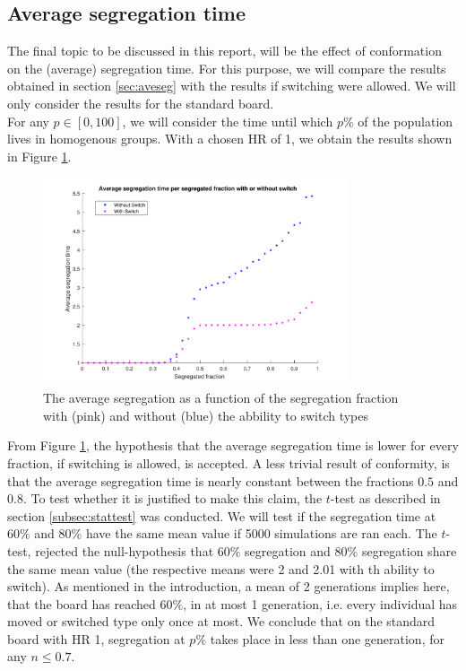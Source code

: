 \subsection{Average segregation time}
The final topic to be discussed in this report, will be the effect of conformation on the (average) segregation time. 
For this purpose, we will compare the results obtained in section \ref{sec:aveseg} with the results if switching were allowed. 
We will only consider the results for the standard board.\\
For any \(p\in [0,100]\), we will consider the time until which \(p\%\) of the population lives in homogenous groups. With a chosen HR of 1, we obtain the results shown in Figure \ref{fig:avesegsw}.

\begin{figure}[H]
    \centering
    \includegraphics[width=0.8\textwidth]{Avesegsw2}
    \caption{The average segregation as a function of the segregation fraction with (pink) and without (blue) the abbility to switch types}
    \label{fig:avesegsw}
\end{figure}

From Figure \ref{fig:avesegsw}, the hypothesis that the average segregation time is lower for every fraction, if switching is allowed, is accepted. 
A less trivial result of conformity, is that the average segregation time is nearly constant between the fractions \(0.5\) and \(0.8\). 
To test whether it is justified to make this claim,  the \(t\)-test as described in section \ref{subsec:stattest} was conducted. We will test if the segregation time at \(60\%\) and \(80\%\) have the same mean value if 5000 simulations are ran each. 
The \(t\)-test, rejected the null-hypothesis that \(60\%\) segregation and \(80\%\) segregation share the same mean value (the respective means were 2 and 2.01 with th ability to switch). As mentioned in the introduction, a mean of 2 generations implies here, that the board has reached \(60\%\), in at most 1 generation, i.e. every individual has moved or switched type only once at most.
We conclude that on the standard board with HR 1, segregation at \(p\%\) takes place in less than one generation, for any \(n\leq 0.7\).\\
 
